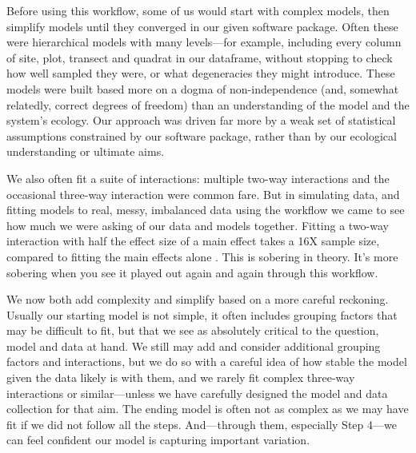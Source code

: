 \documentclass[11pt]{article}
\begin{document}
{%
Before using this workflow, some of us would start with complex models, then simplify models until they converged in our given software package. Often these were hierarchical models with many levels---for example, including every column of site, plot, transect and quadrat in our dataframe, without stopping to check how well sampled they were, or what degeneracies they might introduce. These models were built based more on a dogma of non-independence (and, somewhat relatedly, correct degrees of freedom) than an understanding of the model and the system's ecology. Our approach was driven far more by a weak set of statistical assumptions constrained by our software package, rather than by our ecological understanding or ultimate aims. 

We also often fit a suite of interactions: multiple two-way interactions and the occasional three-way interaction were common fare. But in simulating data, and fitting models to real, messy, imbalanced data using the workflow we came to see how much we were asking of our data and models together. Fitting a two-way interaction with half the effect size of a main effect takes a 16X sample size, compared to fitting the main effects alone \citep[the main effects then average over the interactions, see][for more details]{regotherstories}. This is sobering in theory. It's more sobering when you see it played out again and again through this workflow. 

We now both add complexity and simplify based on a more careful reckoning. Usually our starting model is not simple, it often includes grouping factors that may be difficult to fit, but that we see as absolutely critical to the question, model and data at hand. We still may add and consider additional grouping factors and interactions, but we do so with a careful idea of how stable the model given the data likely is with them, and we rarely fit complex three-way interactions or similar---unless we have carefully designed the model and data collection for that aim. The ending model is often not as complex as we may have fit if we did not follow all the steps. And---through them, especially Step 4---we can feel confident our model is capturing important variation. 

}
\end{document}
